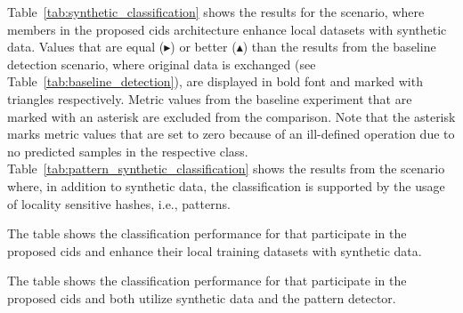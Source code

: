 \documentclass[../../main.tex]{subfiles}
\begin{document}
Table~\ref{tab:synthetic_classification} shows the results for the scenario, where members in the proposed \gls{cids} architecture enhance local datasets with synthetic data. Values that are equal ($\blacktriangleright$) or better ($\blacktriangle$) than the results from the baseline detection scenario, where original data is exchanged (see Table~\ref{tab:baseline_detection}), are displayed in bold font and marked with triangles respectively. Metric values from the baseline experiment that are marked with an asterisk are excluded from the comparison. Note that the asterisk marks metric values that are set to zero because of an ill-defined operation due to no predicted samples in the respective class. Table~\ref{tab:pattern_synthetic_classification} shows the results from the scenario where, in addition to synthetic data, the classification is supported by the usage of locality sensitive hashes, i.e., patterns. 

\begin{table}[H]
    \scriptsize
    \centering
    \setlength{\extrarowheight}{0pt}
    \addtolength{\extrarowheight}{\aboverulesep}
    \addtolength{\extrarowheight}{\belowrulesep}
    \addtolength{\tabcolsep}{-0.4em}
    \setlength{\aboverulesep}{0pt}
    \setlength{\belowrulesep}{0pt}
    \setlength{\extrarowheight}{.15em}
     
    \caption[Detection Performance with Synthetic Data]{The table shows the classification performance for  that participate in the proposed \gls{cids} and enhance their local training datasets with synthetic data.}
    \label{tab:synthetic_classification}
\end{table}

\begin{table}[H]
    \scriptsize
    \centering
    \setlength{\extrarowheight}{0pt}
    \addtolength{\extrarowheight}{\aboverulesep}
    \addtolength{\extrarowheight}{\belowrulesep}
    \addtolength{\tabcolsep}{-0.4em}
    \setlength{\aboverulesep}{0pt}
    \setlength{\belowrulesep}{0pt}
    \setlength{\extrarowheight}{.15em}
     
    \caption[Detection Performance with Synthetic Data and Pattern Detector]{The table shows the classification performance for  that participate in the proposed \gls{cids} and both utilize synthetic data and the pattern detector.}
    \label{tab:pattern_synthetic_classification}
\end{table}
\end{document}

